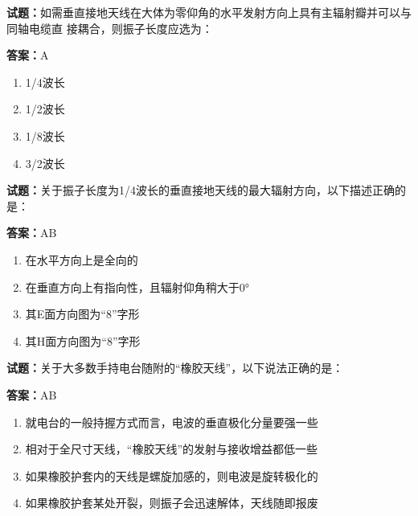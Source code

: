 \documentclass{ctexbook}
\begin{document}




\vspace{1em}

\textbf{试题：}如需垂直接地天线在大体为零仰角的水平发射方向上具有主辐射瓣并可以与同轴电缆直
接耦合，则振子长度应选为： 

\textbf{答案：}A 

\begin{enumerate}[leftmargin=3em]
  \item 1/4波长 

  \item 1/2波长 

  \item 1/8波长 

  \item 3/2波长 

\end{enumerate}





\vspace{1em}

\textbf{试题：}关于振子长度为1/4波长的垂直接地天线的最大辐射方向，以下描述正确的是： 

\textbf{答案：}AB 

\begin{enumerate}[leftmargin=3em]
  \item 在水平方向上是全向的 

  \item 在垂直方向上有指向性，且辐射仰角稍大于0° 

  \item 其E面方向图为“8”字形 

  \item 其H面方向图为“8”字形 

\end{enumerate}





\vspace{1em}

\textbf{试题：}关于大多数手持电台随附的“橡胶天线”，以下说法正确的是： 

\textbf{答案：}AB 

\begin{enumerate}[leftmargin=3em]
  \item 就电台的一般持握方式而言，电波的垂直极化分量要强一些 

  \item 相对于全尺寸天线，“橡胶天线”的发射与接收增益都低一些 

  \item 如果橡胶护套内的天线是螺旋加感的，则电波是旋转极化的 

  \item 如果橡胶护套某处开裂，则振子会迅速解体，天线随即报废 

\end{enumerate}
\end{document}
